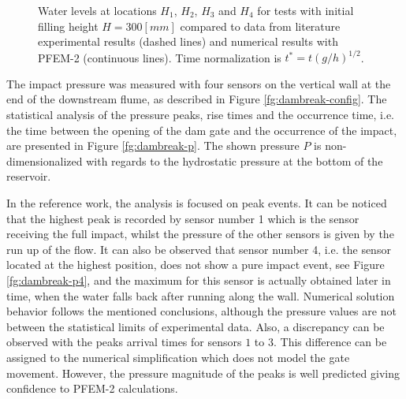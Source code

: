 \begin{figure}[h]
{    }
   \caption{Water levels at locations $H_1$, $H_2$, $H_3$ and $H_4$ for tests with initial filling height $H=300[mm]$ compared to data from literature experimental results\cite{Lobovsky13} (dashed lines) and numerical results with PFEM-2 (continuous lines). Time normalization is $t^*=t(g/h)^{1/2}$.}
   \label{fg:dambreak-h}                %
\end{figure}

The impact pressure was measured with four sensors on the vertical wall at the end of the downstream flume, as described in Figure \ref{fg:dambreak-config}. The statistical analysis of the pressure peaks, rise times and the occurrence time, i.e. the time between
the opening of the dam gate and the occurrence of the impact, are presented in Figure \ref{fg:dambreak-p}. The shown pressure $P$ is non-dimensionalized with regards to the hydrostatic pressure at the bottom of the reservoir.

In the reference work, the analysis is focused on peak events. It can be noticed that the highest peak is recorded by sensor number 1 which is the sensor receiving the full impact, whilst the pressure of the other sensors is given by the run up of the flow. It can also be observed that sensor number 4, i.e. the sensor located at the highest position, does not show a pure impact event, see Figure \ref{fg:dambreak-p4}, and the maximum for this sensor is actually obtained later in time, when the water falls back after running along the wall. Numerical solution behavior follows the mentioned conclusions, although the pressure values are not between the statistical limits of experimental data. Also, a discrepancy can be observed with the peaks arrival times for sensors $1$ to $3$. This difference can be assigned to the numerical simplification which does not model the gate movement. However, the pressure magnitude of the peaks is well predicted giving confidence to PFEM-2 calculations.

